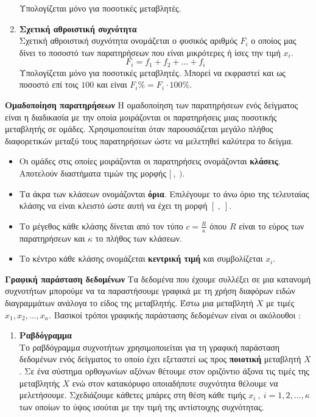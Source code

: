 \documentclass[twoside,nofonts,internet,math,spyros]{frontisthrio}
\begin{document}
\begin{arithmisi}
\begin{enumerate}[label=\bf\arabic*.,itemsep=0mm]
Υπολογίζεται μόνο για ποσοτικές μεταβλητές.
\item \textbf{Σχετική αθροιστική συχνότητα}\\
Σχετική αθροιστική συχνότητα ονομάζεται ο φυσικός αριθμός $ F_i $ ο οποίος μας δίνει το ποσοστό των παρατηρήσεων που είναι μικρότερες ή ίσες την τιμή $ x_i $.
\[ F_i=f_1+f_2+\ldots+f_i \]
Υπολογίζεται μόνο για ποσοτικές μεταβλητές. Μπορεί να εκφραστεί και ως ποσοστό επί τοις $ 100 $ και είναι $ F_i\%=F_i\cdot 100\% $.
\end{enumerate}
\item\textbf{Ομαδοποίηση παρατηρήσεων}
Η ομαδοποίηση των παρατηρήσεων ενός δείγματος είναι η διαδικασία με την οποία μοιράζονται οι παρατηρήσεις μιας ποσοτικής μεταβλητής σε ομάδες. Χρησιμοποιείται όταν παρουσιάζεται μεγάλο πλήθος διαφορετικών μεταξύ τους παρατηρήσεων ώστε να μελετηθεί καλύτερα το δείγμα.
\begin{itemize}
\item Οι ομάδες στις οποίες μοιράζονται οι παρατηρήσεις ονομάζονται \textbf{κλάσεις}. Αποτελούν διαστήματα τιμών της μορφής $ [\ ,\ ) $.
\item Τα άκρα των κλάσεων ονομάζονται \textbf{όρια}. Επιλέγουμε το άνω όριο της τελευταίας κλάσης να είναι κλειστό ώστε αυτή να έχει τη μορφή $ [\ ,\ ] $.
\item Το μέγεθος κάθε κλάσης δίνεται από τον τύπο $ c=\frac{R}{\kappa} $ όπου $ R $ είναι το εύρος των παρατηρήσεων και $ \kappa $ το πλήθος των κλάσεων.
\item Το κέντρο κάθε κλάσης ονομάζεται \textbf{κεντρική τιμή} και συμβολίζεται $ x_i $.
\end{itemize}
\item\textbf{Γραφική παράσταση δεδομένων}
Τα δεδομένα που έχουμε συλλέξει σε μια κατανομή συχνοτήτων μπορούμε να τα παραστήσουμε γραφικά με τη χρήση διαφόρων ειδών διαγραμμάτων ανάλογα το είδος της μεταβλητής. Έστω μια μεταβλητή $ X $ με τιμές $ x_1,x_2,\ldots,x_\kappa $. Βασικοί τρόποι γραφικής παράστασης δεδομένων είναι οι ακόλουθοι :
\begin{enumerate}[label=\bf\arabic*.,leftmargin=4mm]
\item \textbf{Ραβδόγραμμα}\\
Το ραβδόγραμμα συχνοτήτων χρησιμοποιείται για τη γραφική παράσταση δεδομένων ενός δείγματος το οποίο έχει εξεταστεί ως προς \textbf{ποιοτική} μεταβλητή $ X $. Σε ένα σύστημα ορθογωνίων αξόνων θέτουμε στον οριζόντιο άξονα τις τιμές της μεταβλητής $ X $ ενώ στον κατακόρυφο οποιαδήποτε συχνότητα θέλουμε να μελετήσουμε. Σχεδιάζουμε κάθετες μπάρες στη θέση κάθε τιμής $ x_i\ ,\ i=1,2,\ldots,\kappa $ των οποίων το ύψος ισούται με την τιμή της αντίστοιχης συχνότητας.

\end{enumerate}
\end{arithmisi}
\end{document}
